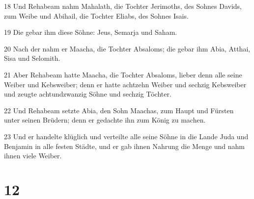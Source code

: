 \par 18 Und Rehabeam nahm Mahalath, die Tochter Jerimoths, des Sohnes Davids, zum Weibe und Abihail, die Tochter Eliabs, des Sohnes Isais.
\par 19 Die gebar ihm diese Söhne: Jeus, Semarja und Saham.
\par 20 Nach der nahm er Maacha, die Tochter Absaloms; die gebar ihm Abia, Atthai, Sisa und Selomith.
\par 21 Aber Rehabeam hatte Maacha, die Tochter Absaloms, lieber denn alle seine Weiber und Kebsweiber; denn er hatte achtzehn Weiber und sechzig Kebsweiber und zeugte achtundzwanzig Söhne und sechzig Töchter.
\par 22 Und Rehabeam setzte Abia, den Sohn Maachas, zum Haupt und Fürsten unter seinen Brüdern; denn er gedachte ihn zum König zu machen.
\par 23 Und er handelte klüglich und verteilte alle seine Söhne in die Lande Juda und Benjamin in alle festen Städte, und er gab ihnen Nahrung die Menge und nahm ihnen viele Weiber.

\chapter{12}


